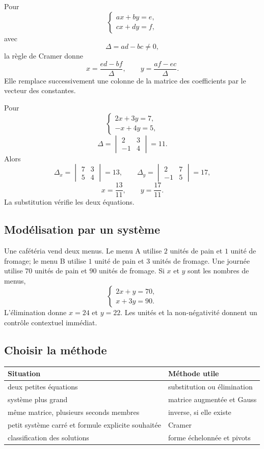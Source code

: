 \documentclass[12pt,a4paper,openany]{book}
\begin{document}
Pour
\[
\begin{cases}
ax+by=e,\\
cx+dy=f,
\end{cases}
\]
avec
\[
\Delta=ad-bc\neq0,
\]
la règle de Cramer donne
\[
x=\frac{ed-bf}{\Delta},
\qquad
 y=\frac{af-ec}{\Delta}.
\]
Elle remplace successivement une colonne de la matrice des coefficients par le vecteur des constantes.

\begin{examplebox}
Pour
\[
\begin{cases}
2x+3y=7,\\
-x+4y=5,
\end{cases}
\]
\[
\Delta=\begin{vmatrix}2&3\\-1&4\end{vmatrix}=11.
\]
Alors
\[
\Delta_x=\begin{vmatrix}7&3\\5&4\end{vmatrix}=13,
\qquad
\Delta_y=\begin{vmatrix}2&7\\-1&5\end{vmatrix}=17,
\]
\[
x=\frac{13}{11},
\qquad y=\frac{17}{11}.
\]
La substitution vérifie les deux équations.
\end{examplebox}

\subsection{Modélisation par un système}

Une cafétéria vend deux menus. Le menu A utilise $2$ unités de pain et $1$ unité de fromage; le menu B utilise $1$ unité de pain et $3$ unités de fromage. Une journée utilise $70$ unités de pain et $90$ unités de fromage. Si $x$ et $y$ sont les nombres de menus,
\[
\begin{cases}
2x+y=70,\\
x+3y=90.
\end{cases}
\]
L'élimination donne $x=24$ et $y=22$. Les unités et la non-négativité donnent un contrôle contextuel immédiat.

\subsection{Choisir la méthode}

\begin{center}
\begin{tabularx}{\textwidth}{@{}lY@{}}
\toprule
Situation & Méthode utile\\\midrule
deux petites équations & substitution ou élimination\\
système plus grand & matrice augmentée et Gauss\\
même matrice, plusieurs seconds membres & inverse, si elle existe\\
petit système carré et formule explicite souhaitée & Cramer\\
classification des solutions & forme échelonnée et pivots\\
\bottomrule
\end{tabularx}
\end{center}
\end{document}
